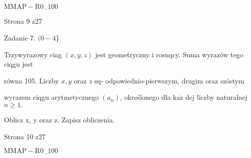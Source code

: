 \documentclass[a4paper,12pt]{article}
\begin{document}
$\mathrm{M}\mathrm{M}\mathrm{A}\mathrm{P}-\mathrm{R}0_{-}100$

Strona 9 z27





Zadanie 7. $(0-4$\}

Trzywyrazowy ciag $(x,y,z)$ jest geometryczny i rosnqcy. Suma wyrazów tego ciqgu jest

równa 105. Liczby $x, y$ oraz $z$ sq- odpowiednio-pierwszym, drugim oraz szóstym

wyrazem ciqgu arytmetycznego $(a_{n})$, określonego dla $\mathrm{k}\mathrm{a}\dot{\mathrm{z}}$ dej liczby naturalnej $n\geq 1.$

Oblicz x, y oraz z. Zapisz obliczenia.

Strona 10 z27

$\mathrm{M}\mathrm{M}\mathrm{A}\mathrm{P}-\mathrm{R}0_{-}100$
\end{document}
